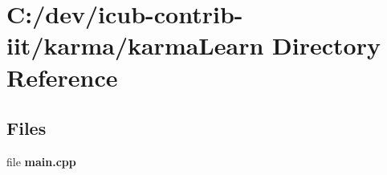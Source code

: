 \section{C\+:/dev/icub-\/contrib-\/iit/karma/karma\+Learn Directory Reference}
\label{dir_d87d1a18a16bd6a3e8cede5b6a773ba9}
\subsection*{Files}
\begin{DoxyCompactItemize}
\item 
file {\bfseries main.\+cpp}
\end{DoxyCompactItemize}
